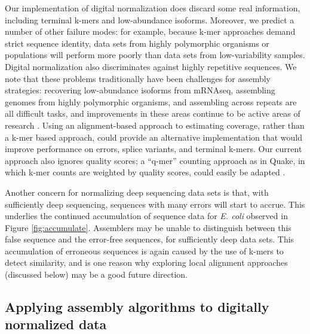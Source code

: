 \documentclass[10pt]{article}
\begin{document}
Our implementation of digital normalization does discard some real
information, including terminal k-mers and low-abundance isoforms.
Moreover, we predict a number of other failure modes: for example,
because k-mer approaches demand strict sequence identity, data sets
from highly polymorphic organisms or populations will perform more
poorly than data sets from low-variability samples.  Digital
normalization also discriminates against highly repetitive
sequences. We note that these problems traditionally have been
challenges for assembly strategies: recovering low-abundance isoforms
from mRNAseq, assembling genomes from highly polymorphic organisms,
and assembling across repeats are all difficult tasks, and
improvements in these areas continue to be active areas of research
\cite{pubmed18549302,pubmed20633259,pubmed18541131}.  Using an
alignment-based approach to estimating coverage, rather than a k-mer
based approach, could provide an alternative implementation that would
improve performance on errors, splice variants, and terminal k-mers.
Our current approach also ignores quality scores; a ``q-mer'' counting
approach as in Quake, in which k-mer counts are weighted by quality
scores, could easily be adapted \cite{pubmed21114842}.

Another concern for normalizing deep sequencing data sets is that,
with sufficiently deep sequencing, sequences with many errors will
start to accrue.  This underlies the continued accumulation of
sequence data for {\em E. coli} observed in Figure
\ref{fig:accumulate}.  Assemblers may be unable to distinguish between
this false sequence and the error-free sequences, for sufficiently
deep data sets.  This accumulation of erroneous sequences is again
caused by the use of k-mers to detect similarity, and is one reason
why exploring local alignment approaches (discussed below) may be a
good future direction.

\newpage

\subsection*{Applying assembly algorithms to digitally normalized data}

\end{document}
